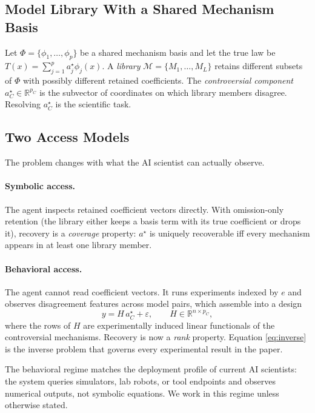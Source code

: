 \documentclass{article}
\newcommand{\real}{\mathbb{R}}
\theoremstyle{plain}
\theoremstyle{definition}
\theoremstyle{remark}
\begin{document}
\subsection{Model Library With a Shared Mechanism Basis}

Let $\Phi=\{\phi_1,\ldots,\phi_p\}$ be a shared mechanism basis and let the
true law be $T(x)=\sum_{j=1}^{p} a^{\star}_j\phi_j(x)$. A \emph{library}
$\mathcal{M}=\{M_1,\ldots,M_L\}$ retains different subsets of $\Phi$ with
possibly different retained coefficients. The \emph{controversial component}
$a^{\star}_C\in\real^{p_C}$ is the subvector of coordinates on which library
members disagree. Resolving $a^{\star}_C$ is the scientific task.

\subsection{Two Access Models}
\label{sec:access-models}

The problem changes with what the AI scientist can actually observe.

\paragraph{Symbolic access.}
The agent inspects retained coefficient vectors directly. With omission-only
retention (the library either keeps a basis term with its true coefficient
or drops it), recovery is a \emph{coverage} property: $a^{\star}$ is
uniquely recoverable iff every mechanism appears in at least one library
member.

\paragraph{Behavioral access.}
The agent cannot read coefficient vectors. It runs experiments indexed by
$e$ and observes disagreement features across model pairs, which assemble
into a design
\begin{equation}
y = H\, a^{\star}_C + \varepsilon, \qquad H\in\real^{n\times p_C},
\label{eq:inverse}
\end{equation}
where the rows of $H$ are experimentally induced linear functionals of the
controversial mechanisms. Recovery is now a \emph{rank} property. Equation
\eqref{eq:inverse} is the inverse problem that governs every experimental
result in the paper.

The behavioral regime matches the deployment profile of current AI
scientists: the system queries simulators, lab robots, or tool endpoints and
observes numerical outputs, not symbolic equations. We work in this regime
unless otherwise stated.
\end{document}
